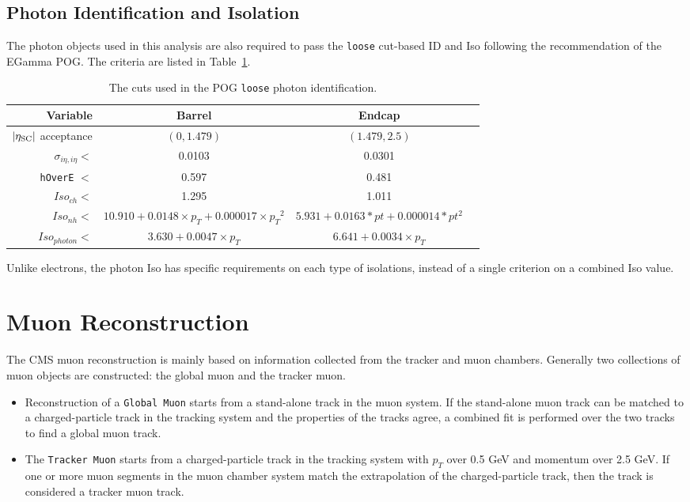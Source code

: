 \subsection{Photon Identification and Isolation}
The photon objects used in this analysis are also required to pass the \texttt{loose} cut-based ID and Iso following the recommendation of the EGamma POG. The criteria are listed in Table~\ref{tab:photon-id}.
\begin{table}[htb!]
\begin{scriptsize}
  \center
  \caption{The cuts used in the POG \texttt{loose} photon identification.}
  \label{tab:photon-id}
  \begin{tabular}{r c c c}
    \hline
    Variable & Barrel & Endcap \\
    \hline
    $|\eta_{\rm SC}|$ acceptance & $(0, 1.479)$ & $(1.479, 2.5)$\\
    $\sigma_{i\eta,i\eta} <$ & 0.0103  & 0.0301 \\
    \texttt{hOverE} $<$ & 0.597  & 0.481 \\
    $Iso_{ch} <$ & 1.295 & 1.011 \\
    $Iso_{nh} <$ & $10.910+0.0148\times p_{T}+0.000017\times {p_{T}}^2$ & $5.931+0.0163*pt+0.000014*pt^2$ \\
    $Iso_{photon} <$ & $3.630+0.0047\times p_{T}$ & $6.641+0.0034\times p_{T}$ \\
    \hline
  \end{tabular}
\end{scriptsize}
\end{table}

\vspace{0.3cm}
Unlike electrons, the photon Iso has specific requirements on each type of isolations, instead of a single criterion on a combined Iso value.

\section{Muon Reconstruction}\label{sec:muonrecon}
The CMS muon reconstruction is mainly based on information collected from the tracker and muon chambers. Generally two collections of muon objects are constructed: the global muon and the tracker muon.~\cite{ob_muonconst1}
\begin{itemize}
\item Reconstruction of a \texttt{Global Muon} starts from a stand-alone track in the muon system. If the stand-alone muon track can be matched to a charged-particle track in the tracking system and the properties of the tracks agree, a combined fit is performed over the two tracks to find a global muon track.
\item The \texttt{Tracker Muon} starts from a charged-particle track in the tracking system with $p_{T}$ over 0.5 GeV and momentum over 2.5 GeV. If one or more muon segments in the muon chamber system match the extrapolation of the charged-particle track, then the track is considered a tracker muon track.
\end{itemize}

